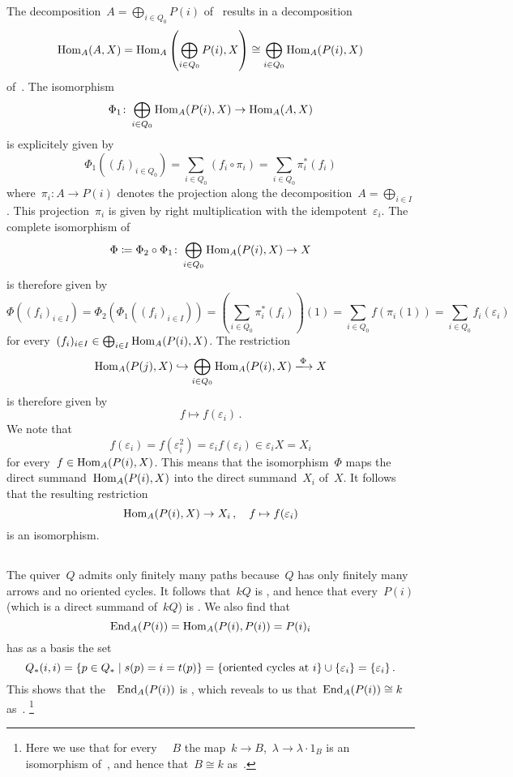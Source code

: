The decomposition~$A = \bigoplus_{i \in Q_0} P(i)$ of~{} results in a decomposition
\[
  \operatorname{Hom}_A(A,X)
  =
  \operatorname{Hom}_A\left( \bigoplus_{i \in Q_0} P(i), X \right)
  \cong
  \bigoplus_{i \in Q_0} \operatorname{Hom}_A(P(i), X)
\]
of~{\kvss}.
The isomorphism
\[
  \Phi_1
  \colon
  \bigoplus_{i \in Q_0} \operatorname{Hom}_A(P(i), X)
  \to
  \operatorname{Hom}_A(A,X)
\]
is explicitely given by
\[
  \Phi_1((f_i)_{i \in Q_0})
  =
  \sum_{i \in Q_0} (f_i \circ \pi_i)
  =
  \sum_{i \in Q_0} \pi_i^*(f_i)
\]
where~$\pi_i \colon A \to P(i)$ denotes the projection along the decomposition~$A = \bigoplus_{i \in I}$.
This projection~$\pi_i$ is given by right multiplication with the idempotent~$\varepsilon_i$.
The complete isomorphism of~{\kvss}
\[
  \Phi
  \coloneqq
  \Phi_2 \circ \Phi_1
  \colon
  \bigoplus_{i \in Q_0} \operatorname{Hom}_A(P(i), X)
  \to
  X
\]
is therefore given by
\[
    \Phi((f_i)_{i \in I})
  = \Phi_2(\Phi_1( (f_i)_{i \in I} ) )
  = \left( \sum_{i \in Q_0} \pi_i^*(f_i) \right)(1)
  = \sum_{i \in Q_0} f(\pi_i(1))
  = \sum_{i \in Q_0} f_i(\varepsilon_i)
\]
for every~$(f_i)_{i \in I} \in \bigoplus_{i \in I} \operatorname{Hom}_A(P(i), X)$.
The restriction
\[
  \Hom_A(P(j), X)
  \inclusion
  \bigoplus_{i \in Q_0} \Hom_A(P(i), X)
  \xlongto{\Phi}
  X
\]
is therefore given by
\[
  f
  \mapsto
  f(\varepsilon_i) \,.
\]
We note that
\[
  f(\varepsilon_i)
  =
  f(\varepsilon_i^2)
  =
  \varepsilon_i f(\varepsilon_i)
  \in
  \varepsilon_i X
  =
  X_i
\]
for every~$f \in \operatorname{Hom}_A(P(i), X)$.
This means that the isomorphism~$\Phi$ maps the direct summand~$\operatorname{Hom}_A(P(i), X)$ into the direct summand~$X_i$ of~$X$.
It follows that the resulting restriction
\[
  \operatorname{Hom}_A(P(i), X)
  \to
  X_i \,,
  \quad
  f
  \mapsto
  f(\varepsilon_i)
\]
is an isomorphism.





\addtocounter{subsection}{1}
\subsection{}

The quiver~$Q$ admits only finitely many paths because~$Q$ has only finitely many arrows and no oriented cycles.
It follows that~$kQ$ is {\fd}, and hence that every~$P(i)$ (which is a direct summand of~$kQ$) is {\fd}.
We also find that
\[
    \operatorname{End}_A(P(i))
  = \operatorname{Hom}_A(P(i),P(i))
  = P(i)_i
\]
has as a basis the set
\[
    Q_*(i,i)
  = \{
      p \in Q_*
    \suchthat
      s(p) = i = t(p)
    \}
  = \{
      \text{oriented cycles at~$i$}
    \}
    \cup
    \{ \varepsilon_i \}
  = \{
      \varepsilon_i
    \} \,.
\]
This shows that the~{\kalg}~$\operatorname{End}_A(P(i))$ is , which reveals to us that~$\operatorname{End}_A(P(i)) \cong k$ as~{\kalgs}.%
\footnote{Here we use that for every ~{\kalg}~$B$ the map~$k \to B$,~$\lambda \to \lambda \cdot 1_B$ is an isomorphism of~{\kalgs}, and hence that~$B \cong k$ as~{\kalgs}. }





